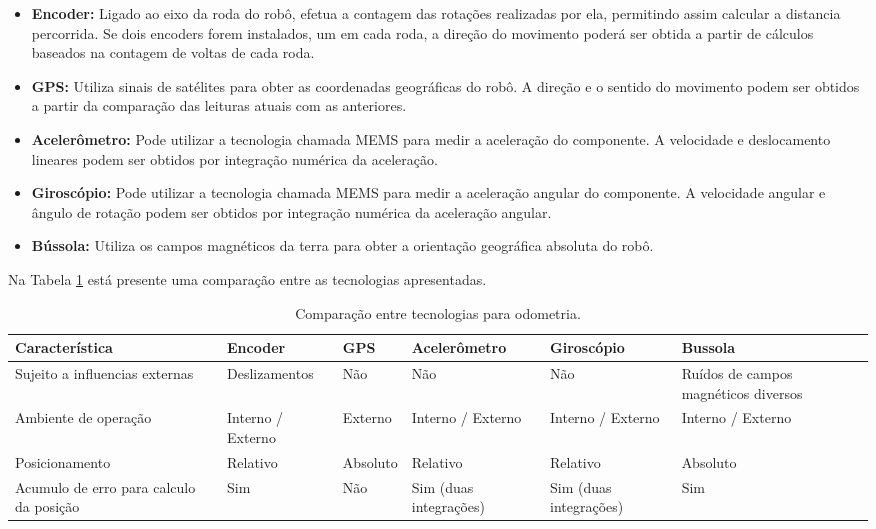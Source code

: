 \begin{itemize}
  \item \textbf{Encoder:} Ligado ao eixo da roda do robô, efetua a contagem das rotações realizadas por ela, permitindo assim calcular a distancia percorrida. Se dois encoders forem instalados, um em cada roda, a direção do movimento poderá ser obtida a partir de cálculos baseados na contagem de voltas de cada roda.
  \item \textbf{GPS:} Utiliza sinais de satélites para obter as coordenadas geográficas do robô. A direção e o sentido do movimento podem ser obtidos a partir da comparação das leituras atuais com as anteriores.
  \item 	\textbf{Acelerômetro:} Pode utilizar a tecnologia chamada MEMS para medir a aceleração do componente. A velocidade e deslocamento lineares podem ser obtidos por integração numérica da aceleração.
  \item 	\textbf{Giroscópio:} Pode utilizar a tecnologia chamada MEMS para medir a aceleração angular do componente. A velocidade angular e ângulo de rotação podem ser obtidos por integração numérica da aceleração angular.
  \item 	\textbf{Bússola:} Utiliza os campos magnéticos da terra para obter a orientação geográfica absoluta do robô.
\end{itemize}

Na Tabela \ref{tab:alternativas_tecnologias_odometria} está presente uma comparação entre as tecnologias apresentadas. 

\begin{table}[h]
  \caption{Comparação entre tecnologias para odometria.}
  \centering
  \begin{tabular}{p{3cm}|p{2.2cm}p{1.7cm}p{2.2cm}p{2.2cm}p{2.2cm}}
    \toprule
    \textbf{Característica} & \textbf{Encoder} & \textbf{GPS} & \textbf{Acelerômetro} & \textbf{Giroscópio} & \textbf{Bussola} \\
    \hline
    Sujeito a influencias externas & Deslizamentos & Não & Não & Não & Ruídos de campos magnéticos diversos \\
    \hline
    Ambiente de operação & Interno / Externo & Externo & Interno / Externo & Interno / Externo & Interno / Externo \\
    \hline
    Posicionamento & Relativo & Absoluto & Relativo & Relativo & Absoluto \\
    \hline
    Acumulo de erro para calculo da posição & Sim & Não & Sim (duas integrações) & Sim (duas integrações) & Sim \\
    \bottomrule
  \end{tabular}
  \label{tab:alternativas_tecnologias_odometria}
\end{table}

